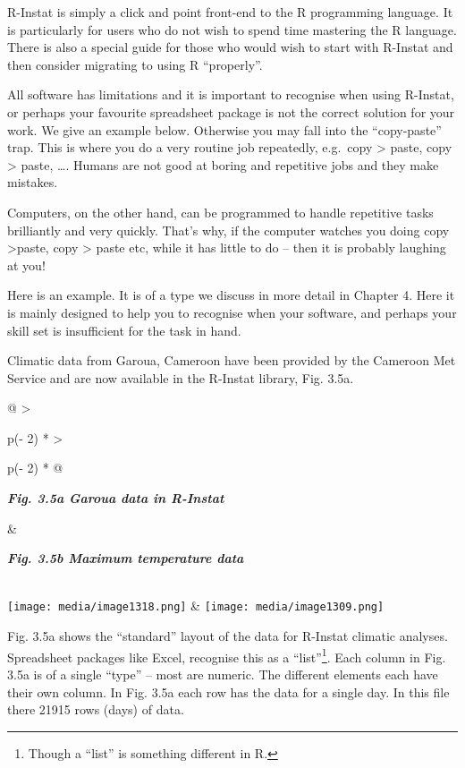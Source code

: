 \documentclass[
  letterpaper,
  DIV=11,
  numbers=noendperiod]{scrreprt}
\begin{document}
R-Instat is simply a click and point front-end to the R programming
language. It is particularly for users who do not wish to spend time
mastering the R language. There is also a special guide for those who
would wish to start with R-Instat and then consider migrating to using R
``properly''.

All software has limitations and it is important to recognise when using
R-Instat, or perhaps your favourite spreadsheet package is not the
correct solution for your work. We give an example below. Otherwise you
may fall into the ``copy-paste'' trap. This is where you do a very
routine job repeatedly, e.g.~copy \textgreater{} paste, copy
\textgreater{} paste, \ldots. Humans are not good at boring and
repetitive jobs and they make mistakes.

Computers, on the other hand, can be programmed to handle repetitive
tasks brilliantly and very quickly. That's why, if the computer watches
you doing copy \textgreater paste, copy \textgreater{} paste etc, while
it has little to do -- then it is probably laughing at you!

Here is an example. It is of a type we discuss in more detail in Chapter
4. Here it is mainly designed to help you to recognise when your
software, and perhaps your skill set is insufficient for the task in
hand.

Climatic data from Garoua, Cameroon have been provided by the Cameroon
Met Service and are now available in the R-Instat library, Fig. 3.5a.

\begin{longtable}[]{@{}
  >{\raggedright\arraybackslash}p{(\columnwidth - 2\tabcolsep) * }
  >{\raggedright\arraybackslash}p{(\columnwidth - 2\tabcolsep) * }@{}}
\toprule\noalign{}
\begin{minipage}[b]{\linewidth}\raggedright
\textbf{\emph{Fig. 3.5a Garoua data in R-Instat}}
\end{minipage} & \begin{minipage}[b]{\linewidth}\raggedright
\textbf{\emph{Fig. 3.5b Maximum temperature data}}
\end{minipage} \\
\midrule\noalign{}
\endhead
\bottomrule\noalign{}
\endlastfoot
\texttt{[image: media/image1318.png]}
&
\texttt{[image: media/image1309.png]} \\
\end{longtable}

Fig. 3.5a shows the ``standard'' layout of the data for R-Instat
climatic analyses. Spreadsheet packages like Excel, recognise this as a
``list''\footnote{Though a ``list'' is something different in R.}. Each
column in Fig. 3.5a is of a single ``type'' -- most are numeric. The
different elements each have their own column. In Fig. 3.5a each row has
the data for a single day. In this file there 21915 rows (days) of data.
\end{document}
